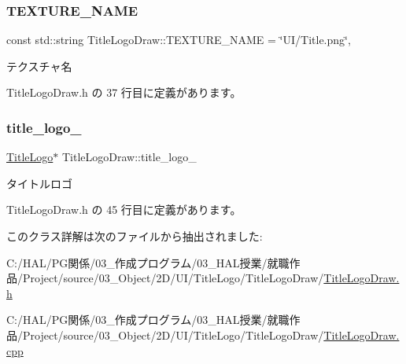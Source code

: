 \mbox{\label{class_title_logo_draw_a663026976213673c6bcc66533b89ffa1}} 
\subsubsection{\texorpdfstring{T\+E\+X\+T\+U\+R\+E\+\_\+\+N\+A\+ME}{TEXTURE\_NAME}}
{\footnotesize\ttfamily const std\+::string Title\+Logo\+Draw\+::\+T\+E\+X\+T\+U\+R\+E\+\_\+\+N\+A\+ME = \char`\"{}UI/Title.\+png\char`\"{}\hspace{0.3cm}{\ttfamily [static]}, {\ttfamily [private]}}



テクスチャ名 



 Title\+Logo\+Draw.\+h の 37 行目に定義があります。

\mbox{\label{class_title_logo_draw_a73a6a0f44bd8d9b5dd5c4e31182881d2}} 
\subsubsection{\texorpdfstring{title\+\_\+logo\+\_\+}{title\_logo\_}}
{\footnotesize\ttfamily \mbox{\hyperlink{class_title_logo}{Title\+Logo}}$\ast$ Title\+Logo\+Draw\+::title\+\_\+logo\+\_\+\hspace{0.3cm}{\ttfamily [private]}}



タイトルロゴ 



 Title\+Logo\+Draw.\+h の 45 行目に定義があります。



このクラス詳解は次のファイルから抽出されました\+:\begin{DoxyCompactItemize}
\item 
C\+:/\+H\+A\+L/\+P\+G関係/03\+\_\+作成プログラム/03\+\_\+\+H\+A\+L授業/就職作品/\+Project/source/03\+\_\+\+Object/2\+D/\+U\+I/\+Title\+Logo/\+Title\+Logo\+Draw/\mbox{\hyperlink{_title_logo_draw_8h}{Title\+Logo\+Draw.\+h}}\item 
C\+:/\+H\+A\+L/\+P\+G関係/03\+\_\+作成プログラム/03\+\_\+\+H\+A\+L授業/就職作品/\+Project/source/03\+\_\+\+Object/2\+D/\+U\+I/\+Title\+Logo/\+Title\+Logo\+Draw/\mbox{\hyperlink{_title_logo_draw_8cpp}{Title\+Logo\+Draw.\+cpp}}\end{DoxyCompactItemize}
